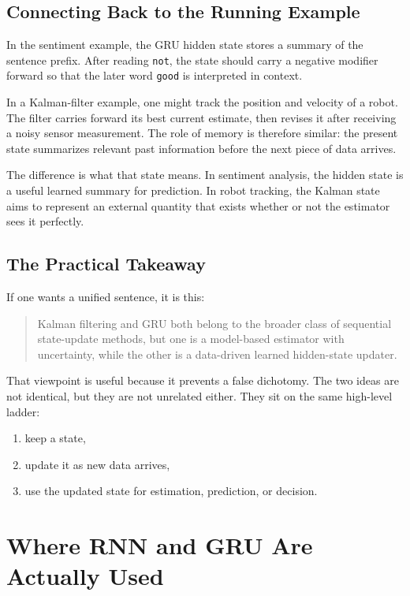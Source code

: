\documentclass[12pt,a4paper]{article}
\begin{document}
\subsection{Connecting Back to the Running Example}

In the sentiment example, the GRU hidden state stores a summary of the sentence prefix. After reading \texttt{not}, the state should carry a negative modifier forward so that the later word \texttt{good} is interpreted in context.

In a Kalman-filter example, one might track the position and velocity of a robot. The filter carries forward its best current estimate, then revises it after receiving a noisy sensor measurement. The role of memory is therefore similar: the present state summarizes relevant past information before the next piece of data arrives.

The difference is what that state means. In sentiment analysis, the hidden state is a useful learned summary for prediction. In robot tracking, the Kalman state aims to represent an external quantity that exists whether or not the estimator sees it perfectly.

\subsection{The Practical Takeaway}

If one wants a unified sentence, it is this:
\begin{quote}
Kalman filtering and GRU both belong to the broader class of sequential state-update methods, but one is a model-based estimator with uncertainty, while the other is a data-driven learned hidden-state updater.
\end{quote}

That viewpoint is useful because it prevents a false dichotomy. The two ideas are not identical, but they are not unrelated either. They sit on the same high-level ladder:
\begin{enumerate}
  \item keep a state,
  \item update it as new data arrives,
  \item use the updated state for estimation, prediction, or decision.
\end{enumerate}

\section{Where RNN and GRU Are Actually Used}
\end{document}
